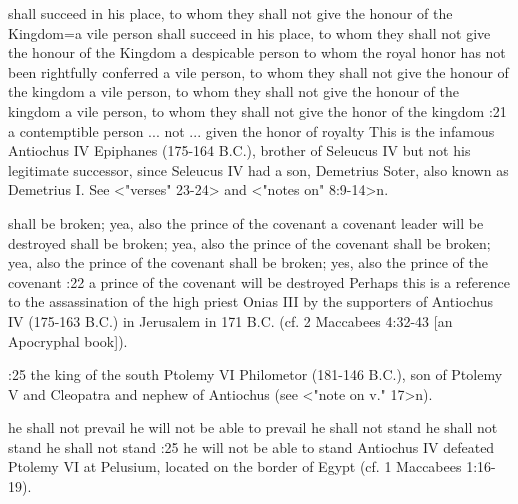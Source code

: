     {shall succeed in his place, to whom they shall not give the honour of the Kingdom}={a vile person shall succeed in his place, to whom they shall not give the honour of the Kingdom} %
    {a despicable person to whom the royal honor has not been rightfully conferred} %
    {a vile person, to whom they shall not give the honour of the kingdom} %
    {a vile person, to whom they shall not give the honour of the kingdom} %
    {a vile person, to whom they shall not give the honor of the kingdom} %
:21 {a contemptible person ... not ... given the honor of royalty} This is the infamous Antiochus IV Epiphanes (175-164 B.C.), 
brother of Seleucus IV but not his legitimate successor, since Seleucus IV had a son, Demetrius Soter, also known as Demetrius I. 
See <"verses" 23-24> and <"notes on" 8:9-14>n.

    {shall be broken; yea, also the prince of the covenant} %
    {a covenant leader will be destroyed} %
    {shall be broken; yea, also the prince of the covenant} %
    {shall be broken; yea, also the prince of the covenant} %
    {shall be broken; yes, also the prince of the covenant} %
:22 {a prince of the covenant will be destroyed} Perhaps this is a reference to the assassination of the high priest Onias III by the 
supporters of Antiochus IV (175-163 B.C.) in Jerusalem in 171 B.C. (cf. 2 Maccabees 4:32-43 [an Apocryphal book]).

:25 {the king of the south} Ptolemy VI Philometor (181-146 B.C.), son of Ptolemy V and Cleopatra and nephew of Antiochus (see <"note on v." 17>n).

    {he shall not prevail} %
    {he will not be able to prevail} %
    {he shall not stand} %
    {he shall not stand} %
    {he shall not stand} %
:25 {he will not be able to stand} Antiochus IV defeated Ptolemy VI at Pelusium, located on the border of Egypt (cf.  1 Maccabees 1:16-19).

